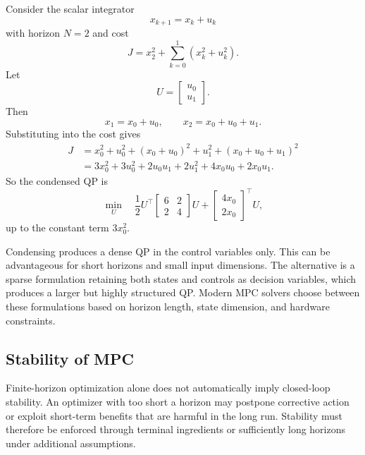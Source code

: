 \begin{eg}
	Consider the scalar integrator
	\[
		x_{k+1}=x_k+u_k
	\]
	with horizon $N=2$ and cost
	\[
		J = x_2^2 + \sum_{k=0}^{1}(x_k^2+u_k^2).
	\]
	Let
	\[
		U=
		\begin{bmatrix}
			u_0 \\ u_1
		\end{bmatrix}.
	\]
	Then
	\[
		x_1=x_0+u_0,
		\qquad
		x_2=x_0+u_0+u_1.
	\]
	Substituting into the cost gives
	\begin{align*}
		J
		&=
		x_0^2 + u_0^2 + (x_0+u_0)^2 + u_1^2 + (x_0+u_0+u_1)^2 \\
		&=
		3x_0^2 + 3u_0^2 + 2u_0u_1 + 2u_1^2 + 4x_0u_0 + 2x_0u_1.
	\end{align*}
	So the condensed QP is
	\[
		\min_U \quad
		\frac{1}{2}
		U^\top
		\begin{bmatrix}
			6 & 2 \\
			2 & 4
		\end{bmatrix}
		U
		+
		\begin{bmatrix}
			4x_0 \\
			2x_0
		\end{bmatrix}^\top
		U,
	\]
	up to the constant term $3x_0^2$.
\end{eg}

\begin{remark}
	Condensing produces a dense QP in the control variables only. This can be advantageous for short horizons and small input dimensions. The alternative is a sparse formulation retaining both states and controls as decision variables, which produces a larger but highly structured QP. Modern MPC solvers choose between these formulations based on horizon length, state dimension, and hardware constraints.
\end{remark}

\subsection{Stability of MPC}
\label{sec:l9-stability-of-mpc}

\begin{intuition}
	Finite-horizon optimization alone does not automatically imply closed-loop stability. An optimizer with too short a horizon may postpone corrective action or exploit short-term benefits that are harmful in the long run. Stability must therefore be enforced through terminal ingredients or sufficiently long horizons under additional assumptions.
\end{intuition}

